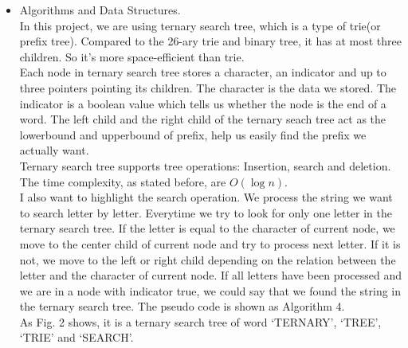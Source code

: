 \begin{itemize}
\item{Algorithms and Data Structures. } \\
In this project, we are using ternary search tree, which is a type of trie(or prefix tree). Compared to the 26-ary trie and binary tree, it has at most three children. So it's more space-efficient than trie. \\
Each node in ternary search tree stores a character, an indicator and up to three pointers pointing its children. The character is the data we stored. The indicator is a boolean value which tells us whether the node is the end of a word. The left child and the right child of the ternary seach tree act as the lowerbound and upperbound of prefix, help us easily find the prefix we actually want. \\
Ternary search tree supports tree operations: Insertion, search and deletion. The time complexity, as stated before, are $ O(\log n) $. \\
I also want to highlight the search operation. We process the string we want to search letter by letter. Everytime we try to look for only one letter in the ternary search tree. If the letter is equal to the character of current node, we move to the center child of current node and try to process next letter. If it is not, we move to the left or right child depending on the relation between the letter and the character of current node. If all letters have been processed and we are in a node with indicator true, we could say that we found the string in the ternary search tree. The pseudo code is shown as Algorithm 4. \\
As Fig. 2 shows, it is a ternary search tree of word `TERNARY', `TREE', `TRIE' and `SEARCH'. 
\begin{figure}[H]
	\label{fig:tst}
	\centering

\end{figure}
\end{itemize}
